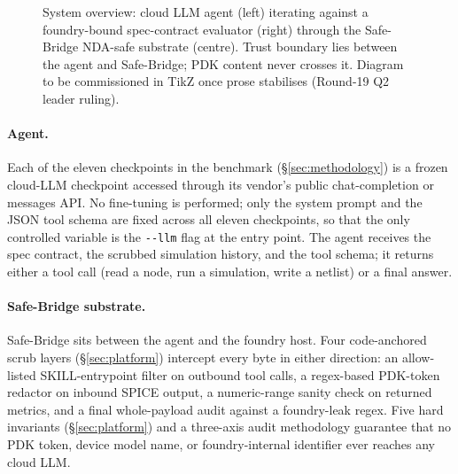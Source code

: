 \begin{figure}[t]
  \centering
  \caption{System overview: cloud LLM agent (left) iterating against
    a foundry-bound spec-contract evaluator (right) through the
    Safe-Bridge NDA-safe substrate (centre). Trust boundary lies
    between the agent and Safe-Bridge; PDK content never crosses
    it. Diagram to be commissioned in TikZ once prose stabilises
    (Round-19 Q2 leader ruling).}
  \label{fig:overview}
\end{figure}

\paragraph{Agent.}
Each of the eleven checkpoints in the benchmark
(\S\ref{sec:methodology}) is a frozen cloud-LLM checkpoint accessed
through its vendor's public chat-completion or messages API. No
fine-tuning is performed; only the system prompt and the JSON tool
schema are fixed across all eleven checkpoints, so that the only
controlled variable is the \texttt{-{}-llm} flag at the
 entry point. The agent receives the
spec contract, the scrubbed simulation history, and the tool
schema; it returns either a tool call (read a node, run a
simulation, write a netlist) or a final answer.

\paragraph{Safe-Bridge substrate.}
Safe-Bridge sits between the agent and the foundry host. Four
code-anchored scrub layers (\S\ref{sec:platform}) intercept every
byte in either direction: an allow-listed SKILL-entrypoint filter
on outbound tool calls, a regex-based PDK-token redactor on
inbound SPICE output, a numeric-range sanity check on returned
metrics, and a final whole-payload audit against a foundry-leak
regex. Five hard invariants (\S\ref{sec:platform}) and a
three-axis audit methodology guarantee that no PDK token, device
model name, or foundry-internal identifier ever reaches any cloud
LLM.

